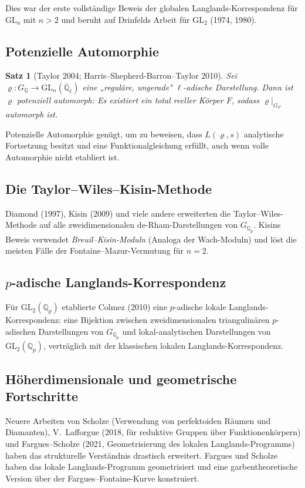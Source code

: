 \documentclass[a4paper,12pt]{amsart}
\newtheorem{theorem}{Satz}[section]
\theoremstyle{definition}
\theoremstyle{remark}
\newcommand{\Q}{\mathbb{Q}}
\newcommand{\GL}{\mathrm{GL}}
\begin{document}
Dies war der erste vollständige Beweis der globalen Langlands-Korrespondenz für
$\GL_n$ mit $n > 2$ und beruht auf Drinfelds Arbeit für $\GL_2$ (1974, 1980).

\subsection{Potenzielle Automorphie}

\begin{theorem}[Taylor 2004; Harris--Shepherd-Barron--Taylor 2010]
\label{satz:potenzielle-automorphie}
Sei $\varrho\colon G_\Q \to \GL_n(\overline{\Q}_\ell)$ eine „reguläre, ungerade"
$\ell$-adische Darstellung. Dann ist $\varrho$ \emph{potenziell automorph}: Es
existiert ein total reeller Körper $F$, sodass $\varrho|_{G_F}$ automorph ist.
\end{theorem}

Potenzielle Automorphie genügt, um zu beweisen, dass $L(\varrho, s)$ analytische
Fortsetzung besitzt und eine Funktionalgleichung erfüllt, auch wenn volle Automorphie
nicht etabliert ist.

\subsection{Die Taylor--Wiles--Kisin-Methode}

Diamond (1997), Kisin (2009) und viele andere erweiterten die Taylor--Wiles-Methode
auf alle zweidimensionalen de-Rham-Darstellungen von $G_{\Q_p}$. Kisins Beweis
verwendet \emph{Breuil--Kisin-Moduln} (Analoga der Wach-Moduln) und löst die meisten
Fälle der Fontaine--Mazur-Vermutung für $n = 2$.

\subsection{$p$-adische Langlands-Korrespondenz}

Für $\GL_2(\Q_p)$ etablierte Colmez (2010) eine $p$-adische lokale Langlands-Korrespondenz:
eine Bijektion zwischen zweidimensionalen triangulinären $p$-adischen Darstellungen
von $G_{\Q_p}$ und lokal-analytischen Darstellungen von $\GL_2(\Q_p)$, verträglich
mit der klassischen lokalen Langlands-Korrespondenz.

\subsection{Höherdimensionale und geometrische Fortschritte}

Neuere Arbeiten von Scholze (Verwendung von perfektoiden Räumen und Diamanten),
V.~Lafforgue (2018, für reduktive Gruppen über Funktionenkörpern) und
Fargues--Scholze (2021, Geometrisierung des lokalen Langlands-Programms) haben das
strukturelle Verständnis drastisch erweitert. Fargues und Scholze haben das lokale
Langlands-Programm geometrisiert und eine garbentheoretische Version über der
Fargues--Fontaine-Kurve konstruiert.
\end{document}
